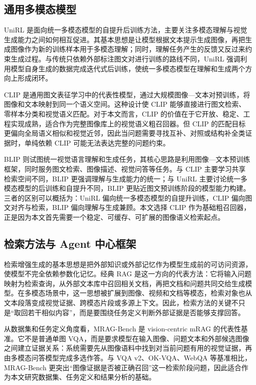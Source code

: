\subsection{通用多模态模型}

UniRL 是面向统一多模态模型的自提升后训练方法，主要关注多模态理解与视觉生成能力之间如何相互促进\cite{mao2025unirl}。其基本思想是让模型根据文本提示生成图像，再把生成图像作为新的训练样本用于多模态理解；同时，理解任务产生的反馈又反过来约束生成过程。与传统只依赖外部标注图文对进行训练的路线不同，UniRL 强调利用模型自身生成的数据完成迭代式后训练，使统一多模态模型在理解和生成两个方向上形成闭环。

CLIP 是通用图文表征学习中的代表性模型，通过大规模图像—文本对预训练，将图像和文本映射到同一个语义空间\cite{radford2021clip}。这种设计使 CLIP 能够直接进行图文检索、零样本分类和视觉语义匹配。对于本文而言，CLIP 的价值在于它开放、稳定、工程实现成熟，适合作为完整图像库上的视觉语义粗召回器。但 CLIP 的匹配目标更偏向全局语义相似和视觉近邻，因此当问题需要寻找互补、对照或结构补全类证据时，单纯依赖 CLIP 可能无法表达完整的问题约束。

BLIP 则试图统一视觉语言理解和生成任务，其核心思路是利用图像—文本预训练框架，同时服务图文检索、图像描述、视觉问答等任务\cite{li2022blip}。与 CLIP 主要学习共享检索空间不同，BLIP 更强调理解与生成能力的统一；与 UniRL 主要讨论统一多模态模型的后训练和自提升不同，BLIP 更贴近图文预训练阶段的模型能力构建。三者的区别可以概括为：UniRL 偏向统一多模态模型的自提升训练，CLIP 偏向图文对齐与检索，BLIP 偏向理解与生成兼顾。本文选择 CLIP 作为基础粗召回器，正是因为本文首先需要一个稳定、可缓存、可扩展的图像语义检索起点。

\subsection{检索方法与 Agent 中心框架}

检索增强生成的基本思想是把外部知识或外部记忆作为模型生成前的可访问资源，使模型不完全依赖参数化记忆。经典 RAG 是这一方向的代表方法：它将输入问题映射为检索查询，从外部文本库中召回相关文档，再把文档和问题共同交给生成模型\cite{lewis2020rag}。在多模态场景中，这一思想被扩展到图像、视频和文档等模态，检索对象也从文本段落变成视觉证据、跨模态片段或多源上下文\cite{mei2025multimodalrag,abootorabi2025ask}。因此，检索方法的关键不只是“取回若干相似内容”，而是要围绕任务定义判断外部证据是否能够支撑回答。

从数据集和任务定义角度看，MRAG-Bench 是 vision-centric mRAG 的代表性基准\cite{hu2024mragbench}。它不是普通单图 VQA，而是要求模型在输入图像、问题文本和外部候选图像之间建立证据关系：系统需要先从图像语料中找到对当前问题有用的视觉证据，再由多模态问答模型完成多选作答。与 VQA v2、OK-VQA、WebQA 等基准相比，MRAG-Bench 更突出“图像证据是否被正确召回”这一检索阶段问题，因此适合作为本文研究数据集、任务定义和结果分析的基础。

